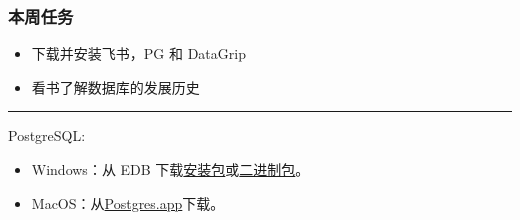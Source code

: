 \documentclass[aspectratio=169, 14pt]{beamer}
\begin{document}
\begin{frame}
    \frametitle{本周任务}
\begin{itemize}
    \item 下载并安装飞书，PG 和 DataGrip
    \item 看书了解数据库的发展历史
\end{itemize}   

\pause
\noindent\rule{\textwidth}{1pt}

PostgreSQL:

\begin{itemize}
    \item {} Windows：从 EDB 下载\href{https://www.enterprisedb.com/downloads/postgres-postgresql-downloads}{安装包}或\href{https://www.enterprisedb.com/download-postgresql-binaries}{二进制包}。
    \item {} MacOS：从\href{https://postgres.app/}{Postgres.app}下载。
\end{itemize}   

\end{frame}
\end{document}

